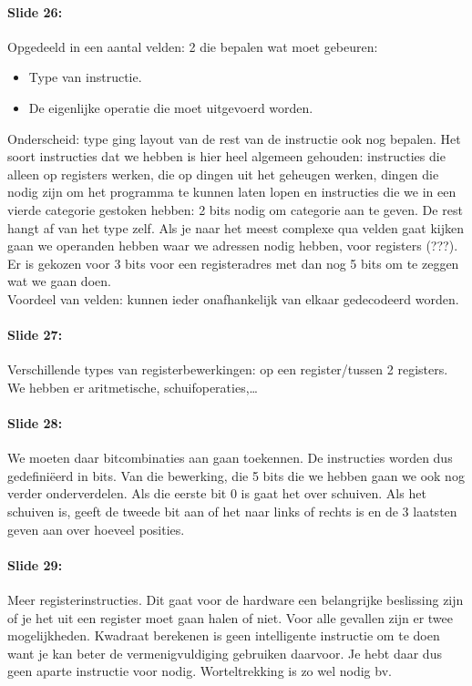 \documentclass[10pt,a4paper]{book}
\begin{document}
\paragraph{Slide 26:} Opgedeeld in een aantal velden: 2 die bepalen wat moet gebeuren:
\begin{itemize}
\item Type van instructie.
\item De eigenlijke operatie die moet uitgevoerd worden.
\end{itemize}
Onderscheid: type ging layout van de rest van de instructie ook nog bepalen. Het soort instructies dat we hebben is hier heel algemeen gehouden: instructies die alleen op registers werken, die op dingen uit het geheugen werken, dingen die nodig zijn om het programma te kunnen laten lopen en instructies die we in een vierde categorie gestoken hebben: 2 bits nodig om categorie aan te geven. De rest hangt af van het type zelf. Als je naar het meest complexe qua velden gaat kijken gaan we operanden hebben waar we adressen nodig hebben, voor registers (???).\\
Er is gekozen voor 3 bits voor een registeradres met dan nog 5 bits om te zeggen wat we gaan doen.\\
Voordeel van velden: kunnen ieder onafhankelijk van elkaar gedecodeerd worden. 

\paragraph{Slide 27:} Verschillende types van registerbewerkingen: op een register/tussen 2 registers. We hebben er aritmetische, schuifoperaties,\ldots 

\paragraph{Slide 28:} We moeten daar bitcombinaties aan gaan toekennen. De instructies worden dus gedefini\"eerd in bits. Van die bewerking, die 5 bits die we hebben gaan we ook nog verder onderverdelen. Als die eerste bit 0 is gaat het over schuiven. Als het schuiven is, geeft de tweede bit aan of het naar links of rechts is en de 3 laatsten geven aan over hoeveel posities. 

\paragraph{Slide 29:} Meer registerinstructies. Dit gaat voor de hardware een belangrijke beslissing zijn of je het uit een register moet gaan halen of niet. Voor alle gevallen zijn er twee mogelijkheden. Kwadraat berekenen is geen intelligente instructie om te doen want je kan beter de vermenigvuldiging gebruiken daarvoor. Je hebt daar dus geen aparte instructie voor nodig. Worteltrekking is zo wel nodig bv. 
\end{document}
